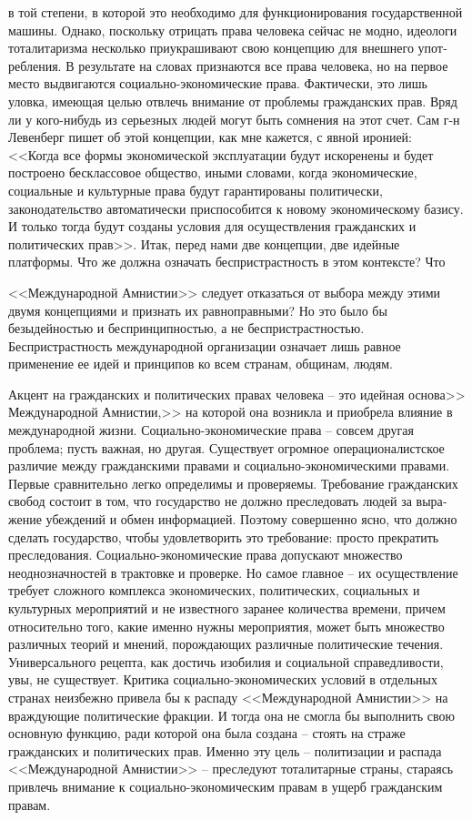 \documentclass{book}
\begin{document}
в той степени, в которой это необходимо для функционирова­ния государственной машины. Однако, поскольку отрицать права человека сейчас не модно, идеологи тоталитаризма не­сколько приукрашивают свою концепцию для внешнего упот­ребления. В результате на словах признаются все права челове­ка, но на первое место выдвигаются социально-экономиче­ские права. Фактически, это лишь уловка, имеющая целью от­влечь внимание от проблемы гражданских прав. Вряд ли у ко­го-нибудь из серьезных людей могут быть сомнения на этот счет. Сам г-н Левенберг пишет об этой концепции, как мне ка­жется, с явной иронией: <<Когда все формы экономической эксплуатации будут искоренены и будет построено бесклассо­вое общество, иными словами, когда экономические, социаль­ные и культурные права будут гарантированы политически, законодательство автоматически приспособится к новому экономическому базису. И только тогда будут созданы условия для осуществления гражданских и политических прав>>.
Итак, перед нами две концепции, две идейные платформы. Что же должна означать беспристрастность в этом контексте? Что 

<<Международной Амнистии>> следует отказаться от выбора между этими двумя концепциями и признать их равноправны­ми? Но это было бы безыдейностью и беспринципностью, а не беспристрастностью. Беспристрастность международной органи­зации означает лишь равное применение ее идей и принципов ко всем странам, общинам, людям.

Акцент на гражданских и политических правах человека -- это идейная основа>> Международной Амнистии,>> на которой она возникла и 
приобрела влияние в международной жизни. Социально-экономические права -- совсем другая проблема; пусть важная, но другая. 
Существует огромное операционалистское различие между гражданскими правами и социально-экономическими правами. Первые 
сравнительно легко опреде­лимы и проверяемы. Требование гражданских свобод состоит в том, что государство не должно преследовать 
людей за выра­жение убеждений и обмен информацией. Поэтому совершенно ясно, что должно сделать государство, чтобы удовлетворить 
это требование: просто прекратить преследования. Социально-экономические права допускают множество  неоднозначно­стей в трактовке 
и проверке. Но самое главное -- их осуще­ствление требует сложного комплекса экономических, полити­ческих, социальных и культурных 
мероприятий и не известно­го заранее количества времени, причем относительно того, ка­кие именно нужны мероприятия, может быть 
множество раз­личных теорий и мнений, порождающих различные полити­ческие течения. Универсального рецепта, как достичь изобилия и 
социальной справедливости, увы, не существует. Критика социально-экономических условий в отдельных странах неиз­бежно привела бы 
к распаду <<Международной Амнистии>> на враждующие политические фракции. И тогда она не смогла бы выполнить свою основную функцию, 
ради которой она была создана -- стоять на страже гражданских и политических прав. Именно эту цель -- политизации и распада 
<<Международной Ам­нистии>> -- преследуют тоталитарные страны, стараясь привлечь внимание к социально-экономическим правам в ущерб граж­данским правам.
\end{document}
